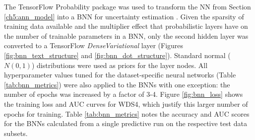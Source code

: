 
The TensorFlow Probability package was used to transform the NN from Section \ref{ch5:ann_model} into a BNN for uncertainty estimation \citep{dillon_tensorflow_2017}.  Given the sparsity of training data available and the multiplier effect that probabilistic layers have on the number of trainable parameters in a BNN, only the second hidden layer was converted to a TensorFlow \textit{DenseVariational} layer (Figures \ref{fig:bnn_text_structure} and \ref{fig:bnn_dot_structure}). Standard normal ($N(0,1)$) distributions were used as priors for the layer nodes. All hyperparameter values tuned for the dataset-specific neural networks (Table \ref{tab:bnn_metrics}) were also applied to the BNNs with one exception: the number of epochs was increased by a factor of 3-4. Figure \ref{fig:bnn_loss} shows the training loss and AUC curves for WDS4, which justify this larger number of epochs for training. Table \ref{tab:bnn_metrics} notes the accuracy and AUC scores for the BNNs calculated from a single predictive run on the respective test data subsets.

